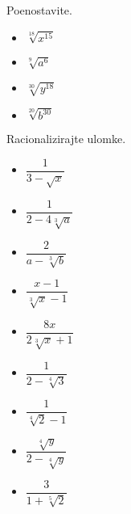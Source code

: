         
            \begin{naloga}
                Poenostavite.
                \begin{multicols}{2}
                    \begin{itemize}
                        \item $\displaystyle \sqrt[18]{x^{15}}$ 
                        \item $\displaystyle \sqrt[9]{a^6}$ 
                        \item $\displaystyle \sqrt[30]{y^{18}}$ 
                        \item $\displaystyle \sqrt[20]{b^{30}}$ 
                    \end{itemize}
                \end{multicols}
            \end{naloga}
        
        
            \begin{naloga}
                Racionalizirajte ulomke.
                \begin{multicols}{2}
                    \begin{itemize}
                        \item $\displaystyle \dfrac{1}{3-\sqrt{x}}$ 
                        \item $\displaystyle \dfrac{1}{2-4\sqrt[3]{a}}$ 
                        \item $\displaystyle \dfrac{2}{a-\sqrt[3]{b}}$ 
                        \item $\displaystyle \dfrac{x-1}{\sqrt[3]{x}-1}$ 
                        \item $\displaystyle \dfrac{8x}{2\sqrt[3]{x}+1}$ 
                        \item $\displaystyle \dfrac{1}{2-\sqrt[4]{3}}$ 
                        \item $\displaystyle \dfrac{1}{\sqrt[4]{2}-1}$ 
                        \item $\displaystyle \dfrac{\sqrt[4]{y}}{2-\sqrt[4]{y}}$ 
                        \item $\displaystyle \dfrac{3}{1+\sqrt[5]{2}}$ 
                    \end{itemize}
                \end{multicols}
            \end{naloga}
        
